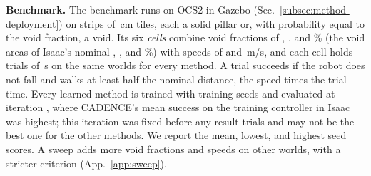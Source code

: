 \noindent\textbf{Benchmark.}
 The benchmark runs on OCS2 in Gazebo
(Sec.~\ref{subsec:method-deployment}) on strips of
\corlBenchTileCm\,cm tiles, each a solid pillar or, with probability
equal to the void fraction, a void. Its six \emph{cells} combine void
fractions of \corlBenchVoidLow, \corlBenchVoidMid, and
\corlBenchVoidHigh\% (the void areas of Isaac's nominal
\corlBenchIsaacVoidLow, \corlBenchIsaacVoidMid, and
\corlBenchIsaacVoidHigh\%) with speeds of \corlBenchSpeedSlow{} and
\corlBenchSpeedFast\,m/s, and each cell holds
\corlBenchTrialsPerCell{} trials of \corlBenchTrialSeconds\,s on the
same worlds for every method. A trial succeeds if the robot does not
fall and walks at least half the nominal distance, the speed times the
trial time. Every learned method is trained with
\corlNumTrainSeeds{} training seeds and evaluated at iteration
\corlOcsCheckpoint, where CADENCE's mean success on the training
controller in Isaac was highest; this iteration was fixed before any
result trials and may not be the best one for the
other methods. We report
the mean, lowest, and
highest seed scores. A sweep adds more void fractions and speeds on other
worlds, with a stricter criterion (App.~\ref{app:sweep}).




